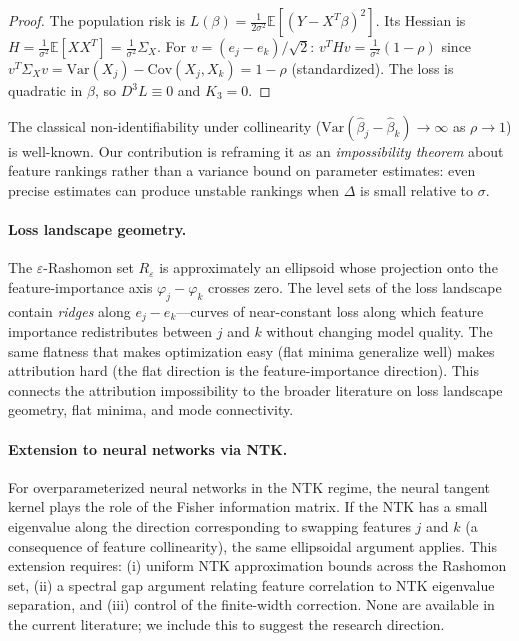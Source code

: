 \documentclass{jmlr}
\newcommand{\E}{\mathbb{E}}
\newcommand{\Var}{\mathrm{Var}}
\begin{document}
\begin{proof}
The population risk is $L(\beta) = \frac{1}{2\sigma^2}\E[(Y-X^T\beta)^2]$. Its Hessian is $H = \frac{1}{\sigma^2}\E[XX^T] = \frac{1}{\sigma^2}\Sigma_X$. For $v = (e_j - e_k)/\sqrt{2}$: $v^T H v = \frac{1}{\sigma^2}(1-\rho)$ since $v^T \Sigma_X v = \Var(X_j) - \text{Cov}(X_j,X_k) = 1-\rho$ (standardized). The loss is quadratic in $\beta$, so $D^3 L \equiv 0$ and $K_3 = 0$.
\end{proof}

The classical non-identifiability under collinearity ($\Var(\hat\beta_j - \hat\beta_k) \to \infty$ as $\rho \to 1$) is well-known. Our contribution is reframing it as an \emph{impossibility theorem} about feature rankings rather than a variance bound on parameter estimates: even precise estimates can produce unstable rankings when $\Delta$ is small relative to $\sigma$.

\paragraph{Loss landscape geometry.}
The $\varepsilon$-Rashomon set $R_\varepsilon$ is approximately an ellipsoid whose projection onto the feature-importance axis $\varphi_j - \varphi_k$ crosses zero. The level sets of the loss landscape contain \emph{ridges} along $e_j - e_k$---curves of near-constant loss along which feature importance redistributes between $j$ and $k$ without changing model quality. The same flatness that makes optimization easy (flat minima generalize well) makes attribution hard (the flat direction is the feature-importance direction). This connects the attribution impossibility to the broader literature on loss landscape geometry, flat minima, and mode connectivity.

\paragraph{Extension to neural networks via NTK.}
For overparameterized neural networks in the NTK regime, the neural tangent kernel plays the role of the Fisher information matrix. If the NTK has a small eigenvalue along the direction corresponding to swapping features $j$ and $k$ (a consequence of feature collinearity), the same ellipsoidal argument applies. This extension requires: (i) uniform NTK approximation bounds across the Rashomon set, (ii) a spectral gap argument relating feature correlation to NTK eigenvalue separation, and (iii) control of the finite-width correction. None are available in the current literature; we include this to suggest the research direction.
\end{document}

